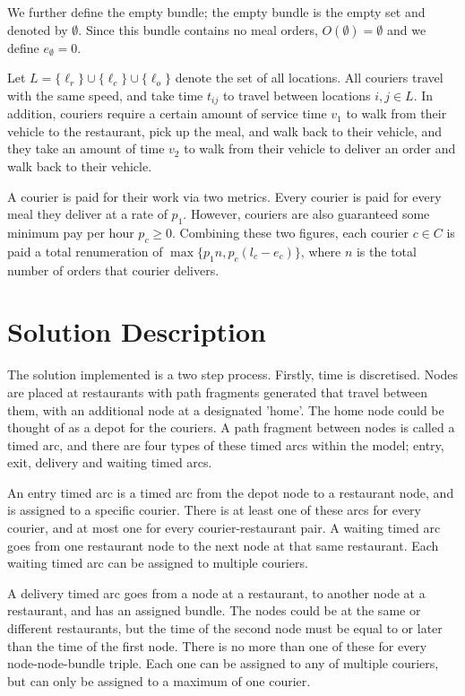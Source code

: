 \documentclass{article}
\begin{document}
We further define the empty bundle; the empty bundle is the empty set and denoted by $\emptyset$. Since this bundle contains no meal orders, $O(\emptyset)=\emptyset$ and we define $e_\emptyset=0$.

Let $L=\{\ell_r\}\cup\{\ell_c\}\cup\{\ell_o\}$ denote the set of all locations. All couriers travel with the same speed, and take time $t_{ij}$ to travel between locations $i,j\in L$. In addition, couriers require a certain amount of service time $v_1$ to walk from their vehicle to the restaurant, pick up the meal, and walk back to their vehicle, and they take an amount of time $v_2$ to walk from their vehicle to deliver an order and walk back to their vehicle.

A courier is paid for their work via two metrics. Every courier is paid for every meal they deliver at a rate of $p_1$. However, couriers are also guaranteed some minimum pay per hour $p_c\geq 0$. Combining these two figures, each courier $c\in C$ is paid a total renumeration of $\max\{p_1n, p_c(l_c-e_c)\}$, where $n$ is the total number of orders that courier delivers.

\section{Solution Description}

The solution implemented is a two step process. Firstly, time is discretised. Nodes are placed at restaurants with path fragments generated that travel between them, with an additional node at a designated 'home'. The home node could be thought of as a depot for the couriers. A path fragment between nodes is called a timed arc, and there are four types of these timed arcs within the model; entry, exit, delivery and waiting timed arcs.

An entry timed arc is a timed arc from the depot node to a restaurant node, and is assigned to a specific courier. There is at least one of these arcs for every courier, and at most one for every courier-restaurant pair. A waiting timed arc goes from one restaurant node to the next node at that same restaurant. Each waiting timed arc can be assigned to multiple couriers.

A delivery timed arc goes from a node at a restaurant, to another node at a restaurant, and has an assigned bundle. The nodes could be at the same or different restaurants, but the time of the second node must be equal to or later than the time of the first node. There is no more than one of these for every node-node-bundle triple. Each one can be assigned to any of multiple couriers, but can only be assigned to a maximum of one courier.
\end{document}

